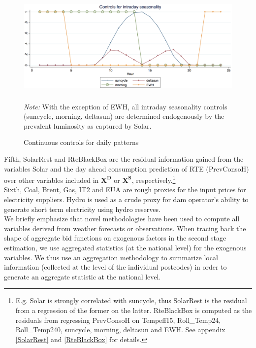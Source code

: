 \begin{figure}[!ht]
\begin{center}
\includegraphics[height=50mm]{figch2/seasonalityday3.pdf} 
\caption{Continuous controls for daily patterns}
\label{seasonalityday3}
\end{center}
\emph{Note:} With the exception of EWH, all intraday seasonality controls (suncycle, morning, deltasun) are determined endogenously by the prevalent luminosity as captured by Solar.
\end{figure}
Fifth, SolarRest and RteBlackBox are the residual information gained from the variables Solar and the day ahead consumption prediction of RTE (PrevConsoH) over other variables included in $\boldsymbol{X^D}$ or $\boldsymbol{X^S}$, respectively.\footnote{E.g. Solar is strongly correlated with suncycle, thus SolarRest is the residual from a regression of the former on the latter. RteBlackBox is computed as the residuals from regressing PrevConsoH on Tempeff15,  Roll\_Temp24,  Roll\_Temp240, suncycle, morning, deltasun and EWH. See appendix \ref{SolarRest} and \ref{RteBlackBox} for details.}  \\
Sixth, Coal, Brent, Gas, IT2 and EUA are rough proxies for the input prices for electricity suppliers. Hydro is used as a crude proxy for dam operator's ability to generate short term electricity using hydro reserves. \\

We briefly emphasize that novel methodologies have been used to compute all variables derived from weather forecasts or observations. 
When tracing back the shape of aggregate bid functions on exogenous factors in the second stage estimation, we use aggregated statistics (at the national level) for the exogenous variables. We thus use an aggregation methodology to summarize local information (collected at the level of the individual postcodes) in order to generate an aggregate statistic at the national level. \\

